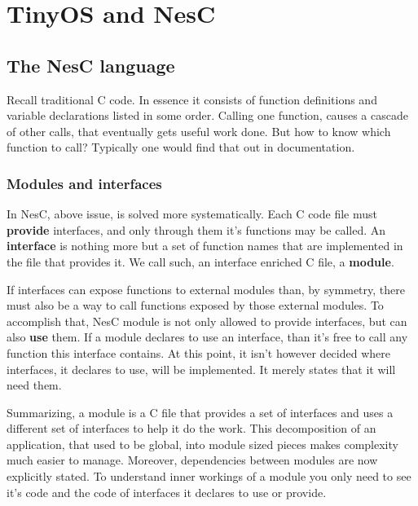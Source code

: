 \chapter{TinyOS and NesC}

\section{The NesC language}

%

Recall traditional C code. In essence it consists of function
definitions and variable declarations listed in some order.  Calling
one function, causes a cascade of other calls, that eventually gets
useful work done. But how to know which function to call? Typically one
would find that out in documentation.

\subsection{Modules and interfaces}

In NesC, above issue, is solved more systematically. Each C code file
must {\bf provide} interfaces, and only through them it's functions may be
called. An {\bf interface} is nothing more but a set of function names
that are implemented in the file that provides it. We call such,
an interface enriched C file, a {\bf module}.

If interfaces can expose functions to external modules than, by
symmetry, there must also be a way to call functions exposed by those
external modules. To accomplish that, NesC module is not only allowed
to provide interfaces, but can also {\bf use} them. If a module declares to
use an interface, than it's free to call any function this interface
contains. At this point, it isn't however decided where interfaces, it
declares to use, will be implemented. It merely states that it will
need them.

Summarizing, a module is a C file that provides a set of interfaces
and uses a different set of interfaces to help it do the work. This
decomposition of an application, that used to be global, into module
sized pieces makes complexity much easier to manage. Moreover,
dependencies between modules are now explicitly stated. To understand
inner workings of a module you only need to see it's code and the code
of interfaces it declares to use or provide.

